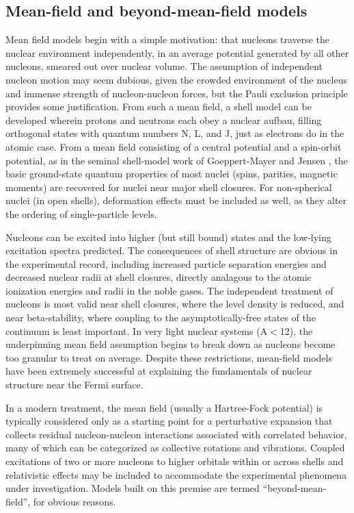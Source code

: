 \subsection{Mean-field and beyond-mean-field models}
Mean field models begin with a simple motivation: that nucleons
traverse the nuclear environment independently, in an average
potential generated by all other nucleons, smeared out over nuclear volume.
The assumption of independent nucleon motion may seem dubious, given the
crowded environment of the nucleus and immense strength of nucleon-nucleon forces,
but the Pauli exclusion principle provides some justification.
From such a mean field, a shell model can be developed wherein protons and neutrons each
obey a nuclear aufbau, filling orthogonal states with quantum numbers N, L, and J, just as electrons do in the atomic 
case. From a mean field consisting of a central
potential and a spin-orbit potential, as in the seminal shell-model work of Goeppert-Mayer
and Jensen \cite{GoeppertMayer1955}, the basic ground-state quantum properties of most nuclei
(spins, parities, magnetic moments) are recovered for nuclei near major shell closures. For non-spherical nuclei (in open shells),
deformation effects must be included as well, as they alter the ordering of single-particle levels.

Nucleons can be
excited into higher (but still bound) states and the low-lying excitation
spectra predicted. The consequences of shell structure are obvious
in the experimental record, including increased particle separation 
energies and decreased nuclear radii at shell closures, directly analagous to
the atomic ionization energies and radii in the noble gases. The independent
treatment of nucleons is most valid near shell closures,
where the level density is reduced, and near beta-stability, where coupling to
the asymptotically-free states of the continuum is least important. In very light nuclear
systems (A$<$12), the underpinning mean field assumption begins to break down as
nucleons become too granular to treat on average. Despite these restrictions, mean-field models have
been extremely successful at explaining the fundamentals of nuclear structure near the Fermi
surface.

In a modern treatment, the mean field (usually a Hartree-Fock potential)
is typically considered only as a starting point for a perturbative
expansion that collects residual nucleon-nucleon interactions associated with
correlated behavior, many of which can be categorized as collective rotations
and vibrations. Coupled excitations of
two or more nucleons to higher orbitals within or across shells and relativistic effects may 
be included to accommodate the experimental phenomena under investigation.
Models built on this premise are termed ``beyond-mean-field'', for obvious reasons.

